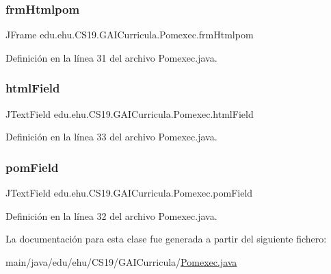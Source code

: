 \subsubsection{\texorpdfstring{frmHtmlpom}{frmHtmlpom}}
{\footnotesize\ttfamily J\+Frame edu.\+ehu.\+C\+S19.\+G\+A\+I\+Curricula.\+Pomexec.\+frm\+Htmlpom\hspace{0.3cm}{\ttfamily [private]}}



Definición en la línea 31 del archivo Pomexec.\+java.

\mbox{\label{a00029_a70bdb1d4b3b75dab759706ce0d85c9cf}} 
\subsubsection{\texorpdfstring{htmlField}{htmlField}}
{\footnotesize\ttfamily J\+Text\+Field edu.\+ehu.\+C\+S19.\+G\+A\+I\+Curricula.\+Pomexec.\+html\+Field\hspace{0.3cm}{\ttfamily [private]}}



Definición en la línea 33 del archivo Pomexec.\+java.

\mbox{\label{a00029_a7ea71ef0b61fa8df0b1689d11ce167cf}} 
\subsubsection{\texorpdfstring{pomField}{pomField}}
{\footnotesize\ttfamily J\+Text\+Field edu.\+ehu.\+C\+S19.\+G\+A\+I\+Curricula.\+Pomexec.\+pom\+Field\hspace{0.3cm}{\ttfamily [private]}}



Definición en la línea 32 del archivo Pomexec.\+java.



La documentación para esta clase fue generada a partir del siguiente fichero\+:\begin{DoxyCompactItemize}
\item 
main/java/edu/ehu/\+C\+S19/\+G\+A\+I\+Curricula/\mbox{\hyperlink{a00005}{Pomexec.\+java}}\end{DoxyCompactItemize}
